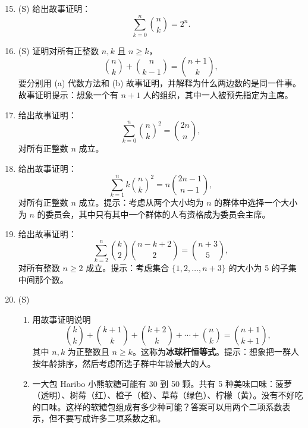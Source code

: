 \documentclass[UTF8,12pt,a4paper,fontset=fandol]{ctexart}
\begin{document}
\begin{enumerate}
  \setcounter{enumi}{14}
  \item (S) 给出故事证明：
  \[
    \sum_{k=0}^{n}\binom nk=2^n.
  \]

  \item (S) 证明对所有正整数 $n,k$ 且 $n\ge k$，
  \[
    \binom nk+\binom n{k-1}=\binom{n+1}{k},
  \]
  要分别用 (a) 代数方法和 (b) 故事证明，并解释为什么两边数的是同一件事。故事证明提示：想象一个有 $n+1$ 人的组织，其中一人被预先指定为主席。

  \item 给出故事证明：
  \[
    \sum_{k=0}^{n}\binom nk^2=\binom{2n}{n},
  \]
  对所有正整数 $n$ 成立。

  \item 给出故事证明：
  \[
    \sum_{k=1}^{n} k\binom nk^2
    =n\binom{2n-1}{n-1},
  \]
  对所有正整数 $n$ 成立。提示：考虑从两个大小均为 $n$ 的群体中选择一个大小为 $n$ 的委员会，其中只有其中一个群体的人有资格成为委员会主席。

  \item 给出故事证明：
  \[
    \sum_{k=2}^{n}\binom k2\binom{n-k+2}{2}
    =\binom{n+3}{5},
  \]
  对所有整数 $n\ge2$ 成立。提示：考虑集合 $\{1,2,\ldots,n+3\}$ 的大小为 5 的子集中间那个数。

  \item (S)
  \begin{enumerate}
    \item 用故事证明说明
    \[
      \binom kk+\binom{k+1}{k}+\binom{k+2}{k}+\cdots+\binom nk
      =\binom{n+1}{k+1},
    \]
    其中 $n,k$ 为正整数且 $n\ge k$。这称为\textbf{冰球杆恒等式}。提示：想象把一群人按年龄排序，然后考虑所选子群中年龄最大的人。
    \item 一大包 Haribo 小熊软糖可能有 30 到 50 颗。共有 5 种美味口味：菠萝（透明）、树莓（红）、橙子（橙）、草莓（绿色）、柠檬（黄）。没有不好吃的口味。这样的软糖包组成有多少种可能？答案可以用两个二项系数表示，但不要写成许多二项系数之和。
  \end{enumerate}


\end{enumerate}
\end{document}
